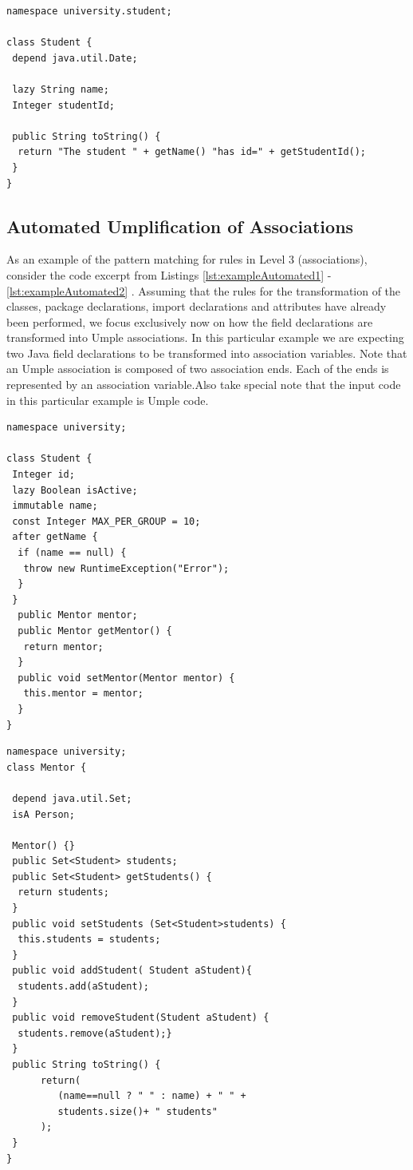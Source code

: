 \begin{lstlisting}[style=umpleOut, label=lst:level2exampleGenerator, caption=Umple code generated -- Level 2]
namespace university.student;

class Student {
 depend java.util.Date;
	
 lazy String name;
 Integer studentId;
       
 public String toString() {
  return "The student " + getName() "has id=" + getStudentId();
 }
}   
\end{lstlisting}

\subsection{Automated Umplification of Associations}

As an example of the pattern matching for rules in Level 3 (associations), consider the code excerpt from Listings \ref{lst:exampleAutomated1} - \ref{lst:exampleAutomated2} . Assuming that the rules for the transformation of the classes, package declarations, import declarations and attributes have already been performed, we focus exclusively now on how the field declarations are transformed into Umple associations. In this particular example we are expecting two Java field declarations to be transformed into association variables. Note that an Umple association is composed of two association ends. Each of the ends is represented by an association variable.Also take special note that the input code in this particular example is Umple code.

\begin{lstlisting}[style=UmpleIn,caption=Student.ump,label=lst:exampleAutomated1]
namespace university;

class Student { 
 Integer id; 
 lazy Boolean isActive; 
 immutable name; 
 const Integer MAX_PER_GROUP = 10; 
 after getName {
  if (name == null) { 
   throw new RuntimeException("Error");
  }
 }
  public Mentor mentor; 
  public Mentor getMentor() { 
   return mentor; 
  }
  public void setMentor(Mentor mentor) { 
   this.mentor = mentor; 
  } 
}
\end{lstlisting}

\begin{lstlisting}[style=UmpleIn,caption=Mentor.ump,label=lst:exampleAutomated2]
namespace university;
class Mentor { 

 depend java.util.Set;
 isA Person;
 
 Mentor() {}
 public Set<Student> students;
 public Set<Student> getStudents() {
  return students; 
 } 
 public void setStudents (Set<Student>students) { 
  this.students = students;
 } 
 public void addStudent( Student aStudent){
  students.add(aStudent); 
 }
 public void removeStudent(Student aStudent) {
  students.remove(aStudent);} 
 } 
 public String toString() {
      return(
         (name==null ? " " : name) + " " +
         students.size()+ " students"
      );
 }
}
\end{lstlisting}

